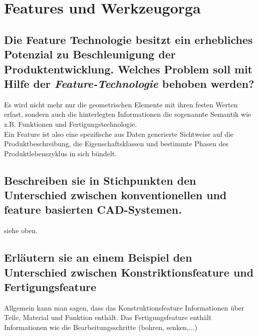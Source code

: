 \newpage

\section{Features und Werkzeugorga}

\subsection*{Die Feature Technologie besitzt ein erhebliches Potenzial zu Beschleunigung der Produktentwicklung. Welches Problem soll mit Hilfe der \emph{Feature-Technologie} behoben werden?}

Es wird nicht mehr nur die geometrischen Elemente mit ihren festen Werten erfast, sondern auch die hinterlegten Informationen die sogenannte \glqq Semantik\grqq {} wie z.B. Funktionen und Fertigungstechnologie. \\

Ein Feature ist also eine spezifische aus Daten generierte Sichtweise auf die Produktbeschreibung, die Eigenschaftsklassen und bestimmte Phasen des Produktlebenszyklus in sich bündelt.

\subsection*{Beschreiben sie in Stichpunkten den Unterschied zwischen \glqq konventionellen\grqq {} und feature basierten CAD-Systemen.}

siehe oben.

\subsection*{Erläutern sie an einem Beispiel den Unterschied zwischen \glqq Konstriktionsfeature\grqq {} und \glqq Fertigungsfeature\grqq}

Allgemein kann man sagen, dass das Konstruktionsfeature Informationen über Teile, Material und Funktion enthält. Das Fertigungsfeature enthält Informationen wie die Bearbeitungsschritte (bohren, senken,...)

